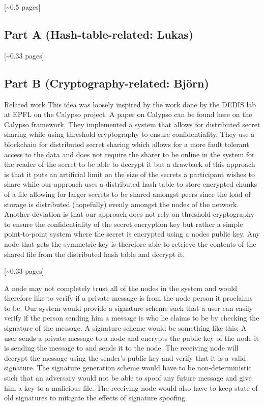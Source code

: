 \documentclass[12pt,a4paper,draft]{article}
\begin{document}
[\textasciitilde{}0.5 pages]

\subsection{Part A (Hash-table-related: Lukas)}

[\textasciitilde{}0.33 pages]

\subsection{Part B (Cryptography-related: Björn)}
Related work
This idea was loosely inspired by the work done by the DEDIS lab at EPFL on the Calypso project. A paper on Calypso can be found here on the Calypso framework. They implemented a system that allows for distributed secret sharing while using threshold cryptography to ensure confidentiality. They use a blockchain for distributed secret sharing which allows for a more fault tolerant access to the data and does not require the sharer to be online in the system for the reader of the secret to be able to decrypt it but a drawback of this approach is that it puts an artificial limit on the size of the secrets a participant wishes to share while our approach uses a distributed hash table to store encrypted chunks of a file allowing for larger secrets to be shared amongst peers since the load of storage is distributed (hopefully) evenly amongst the nodes of the network. Another deviation is that our approach does not rely on threshold cryptography to ensure the confidentiality of the secret encryption key but rather a simple point-to-point system where the secret is encrypted using a nodes public key. Any node that gets the symmetric key is therefore able to retrieve the contents of the shared file from the distributed hash table and decrypt it.  

[\textasciitilde{}0.33 pages] 

A node may not completely trust all of the nodes in the system and would therefore like to verify if a private message is from the node person it proclaims to be. Our system would provide a signature scheme such that a user can easily verify if the person sending him a message is who he claims to be by checking the signature of the message. A signature scheme would be something like this: A user sends a private message to a node and encrypts the public key of the node it is sending the message to and sends it to the node. The receiving node will decrypt the message using the sender’s  public key and verify that it is a valid signature. The signature generation scheme would have to be non-deterministic such that an adversary would not be able to spoof any future message and give him a key to a malicious file. The receiving node would also have to keep state of old signatures to mitigate the effects of signature spoofing.
\end{document}
